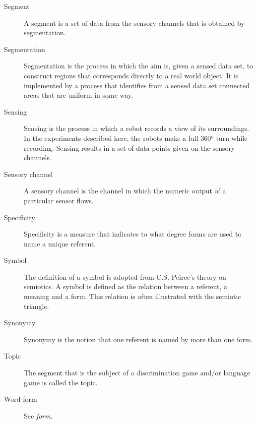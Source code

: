 \begin{description}
\item[Segment] A segment is a set of data from the sensory channels that is obtained by segmentation.

\item[Segmentation] Segmentation is the process in which the aim is, given a sensed data set, to construct regions that corresponds directly to a real world object. It is implemented by a process that identifies from a sensed data set connected areas that are uniform in some way.

\item[Sensing] Sensing is the process in which a robot records a  view of its surroundings. In the experiments described here, the robots make a full 360$^o$ turn while recording. Sensing results in a set of data points given on the sensory channels.

\item[Sensory channel] A sensory channel is the channel in which the numeric output of a particular sensor flows.

\item[Specificity] Specificity is a measure that indicates to what degree forms are used to name a unique referent.

\item[Symbol] The definition of a symbol is adopted from C.S. Peirce's theory on semiotics. A symbol is defined as the relation between a referent, a meaning and a form. This relation is often illustrated with the semiotic triangle. 

\item[Synonymy] Synonymy is the notion that one referent is named by more than one form.

\item[Topic] The segment that is the subject of a discrimination game and/or language game is called the topic.

\item[Word-form] See {\it form}.

\end{description}







